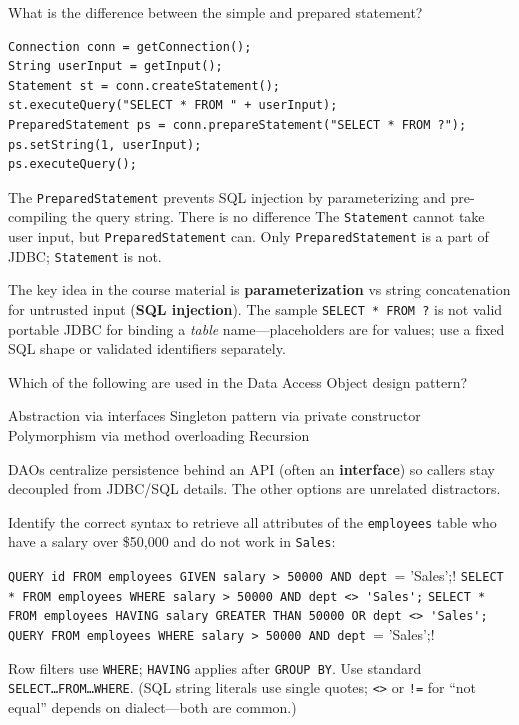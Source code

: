 \newpage

\question[4]
What is the difference between the simple and prepared statement?
\begin{lstlisting}[style=javaexam]
Connection conn = getConnection();
String userInput = getInput(); 
Statement st = conn.createStatement();
st.executeQuery("SELECT * FROM " + userInput);
PreparedStatement ps = conn.prepareStatement("SELECT * FROM ?");
ps.setString(1, userInput);
ps.executeQuery();
\end{lstlisting}
\begin{choices}
  \CorrectChoice The \texttt{PreparedStatement} prevents SQL injection by parameterizing and pre-compiling the query string.
  \choice There is no difference
  \choice The \texttt{Statement} cannot take user input, but \texttt{PreparedStatement} can.
  \choice Only \texttt{PreparedStatement} is a part of JDBC; \texttt{Statement} is not.
\end{choices}
\begin{solution}
  The key idea in the course material is \textbf{parameterization} vs string concatenation for untrusted input (\textbf{SQL injection}). The sample \texttt{SELECT * FROM ?} is not valid portable JDBC for binding a \emph{table} name---placeholders are for values; use a fixed SQL shape or validated identifiers separately.
\end{solution}

\question[4]
Which of the following are used in the Data Access Object design pattern?
\begin{choices}
  \CorrectChoice Abstraction via interfaces
  \choice Singleton pattern via private constructor
  \choice Polymorphism via method overloading
  \choice Recursion
\end{choices}
\begin{solution}
  DAOs centralize persistence behind an API (often an \textbf{interface}) so callers stay decoupled from JDBC/SQL details. The other options are unrelated distractors.
\end{solution}

\question[4]
Identify the correct syntax to retrieve all attributes of the \texttt{employees} table who have a salary over \$50{,}000 and do not work in \texttt{Sales}:
\begin{choices}
  \choice \lstinline[style=sqlinline]!QUERY id FROM employees GIVEN salary > 50000 AND dept != 'Sales';!
  \CorrectChoice \lstinline[style=sqlinline]!SELECT * FROM employees WHERE salary > 50000 AND dept <> 'Sales';!
  \choice \lstinline[style=sqlinline]!SELECT * FROM employees HAVING salary GREATER THAN 50000 OR dept <> 'Sales';!
  \choice \lstinline[style=sqlinline]!QUERY FROM employees WHERE salary > 50000 AND dept != 'Sales';!
\end{choices}
\begin{solution}
  Row filters use \texttt{WHERE}; \texttt{HAVING} applies after \texttt{GROUP BY}. Use standard \\
  \texttt{SELECT\ldots FROM\ldots WHERE}. (SQL string literals use single quotes; \texttt{<>} or \texttt{!=} for ``not equal'' depends on dialect---both are common.)
\end{solution}

